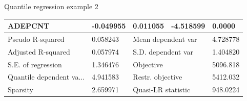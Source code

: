 \documentclass{beamer}
\begin{document}
\begin{frame}{Quantile regression example 2}
\begin{table}[]
\begin{tabular}{@{}lllll@{}}
ADEPCNT                                                                                                & -0.049955                                                                                & 0.011055                                                                               & -4.518599                                                                                & 0.0000                                                                                \\ \midrule
Pseudo R-squared                                                                                       & 0.058243                                                                                 & \multicolumn{2}{l}{Mean dependent var}                                                                                                                                            & 4.728778                                                                              \\
Adjusted R-squared                                                                                     & 0.057974                                                                                 & \multicolumn{2}{l}{S.D. dependent var}                                                                                                                                            & 1.404820                                                                              \\
S.E. of regression                                                                                     & 1.346476                                                                                 & \multicolumn{2}{l}{Objective}                                                                                                                                                     & 5096.818                                                                              \\
Quantile dependent va...                                                                               & 4.941583                                                                                 & \multicolumn{2}{l}{Restr. objective}                                                                                                                                              & 5412.032                                                                              \\
Sparsity                                                                                               & 2.659971                                                                                 & \multicolumn{2}{l}{Quasi-LR statistic}                                                                                                                                            & 948.0224                                                                              \\

\end{tabular}
\end{table}
\end{frame}
\end{document}
